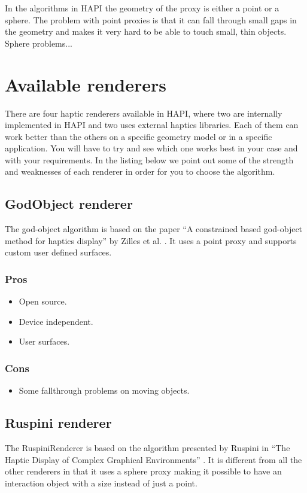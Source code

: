 In the algorithms in HAPI the geometry of the proxy is either a point
or a sphere. The problem with point proxies is that it can fall
through small gaps in the geometry and makes it very hard to be able
to touch small, thin objects. Sphere problems... 

\section{Available renderers}
There are four haptic renderers available in HAPI, where two are internally
implemented in HAPI and two uses external haptics libraries. Each of them can work better than the others on a specific geometry model or in a specific application. You will have to try and see which one works best in your case and with your requirements. In the listing below we point out some of the strength and weaknesses of each renderer in order for you to choose the algorithm. 

\subsection{GodObject renderer}
The god-object algorithm is based on the paper ``A constrained based god-object method for haptics display'' by Zilles et al. \cite{zilles95constraintbased}. It uses a point proxy and supports custom user defined surfaces.


\begin{minipage}[t]{3in}
\subsubsection{Pros} 
\begin{itemize} 
\item Open source. 
\item Device independent. 
\item User surfaces. 
\end{itemize} 
\end{minipage}
\begin{minipage}[t]{3in}
\subsubsection{Cons} 
\begin{itemize} 
\item Some fallthrough problems on moving objects.
\end{itemize}
\end{minipage}

\subsection{Ruspini renderer}
The RuspiniRenderer is based on the algorithm presented by Ruspini in ``The Haptic Display of Complex Graphical Environments'' \cite{ruspini}. It is different from all the other renderers in that it uses a sphere proxy making it possible to have an interaction object with a size instead of just a point.  

